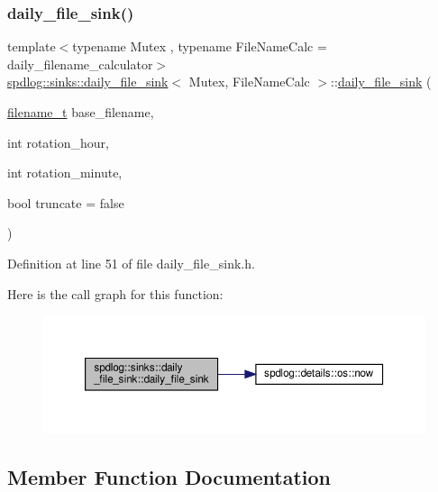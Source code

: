 \subsubsection{\texorpdfstring{daily\+\_\+file\+\_\+sink()}{daily\_file\_sink()}}
{\footnotesize\ttfamily template$<$typename Mutex , typename File\+Name\+Calc  = daily\+\_\+filename\+\_\+calculator$>$ \\
\hyperlink{classspdlog_1_1sinks_1_1daily__file__sink}{spdlog\+::sinks\+::daily\+\_\+file\+\_\+sink}$<$ Mutex, File\+Name\+Calc $>$\+::\hyperlink{classspdlog_1_1sinks_1_1daily__file__sink}{daily\+\_\+file\+\_\+sink} (\begin{DoxyParamCaption}\item[{\hyperlink{namespacespdlog_acf7ce125b3622e44f8f1702d699e0b06}{filename\+\_\+t}}]{base\+\_\+filename,  }\item[{int}]{rotation\+\_\+hour,  }\item[{int}]{rotation\+\_\+minute,  }\item[{bool}]{truncate = {\ttfamily false} }\end{DoxyParamCaption})\hspace{0.3cm}{\ttfamily [inline]}}



Definition at line 51 of file daily\+\_\+file\+\_\+sink.\+h.

Here is the call graph for this function\+:
\nopagebreak
\begin{figure}[H]
\begin{center}
\leavevmode
\includegraphics[width=350pt]{classspdlog_1_1sinks_1_1daily__file__sink_a442164b0813283bc631ad39708fb3669_cgraph}
\end{center}
\end{figure}


\subsection{Member Function Documentation}
\mbox{\label{classspdlog_1_1sinks_1_1daily__file__sink_a37199f25868ac70b91e4f126bcc4b3f8}} 
